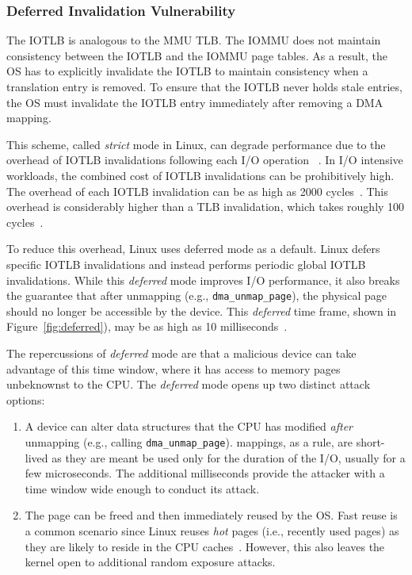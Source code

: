 \subsubsection{Deferred Invalidation Vulnerability}\label{sec:deferred}
The IOTLB is analogous to the MMU TLB. The IOMMU does not maintain consistency between the IOTLB and the IOMMU page tables. As a result, the OS has to explicitly invalidate the IOTLB to maintain consistency when a translation entry is removed. To ensure that the IOTLB never holds stale entries, the OS must invalidate the IOTLB entry immediately after removing a DMA mapping. 

This scheme, called \emph{strict} mode in Linux, can degrade performance due to the overhead of IOTLB invalidations following each I/O operation ~\cite{MMT16,MSMT18,Peleg15}. In I/O intensive workloads, the combined cost of IOTLB invalidations can be prohibitively high. The overhead of each IOTLB invalidation can be as high as 2000 cycles~\cite{ABYTS11}. This overhead is considerably higher than a TLB invalidation, which takes roughly 100 cycles~\cite{Han14}. 

To reduce this overhead, Linux uses deferred mode as a default. Linux defers specific IOTLB invalidations and instead performs periodic global IOTLB invalidations. While this \emph{deferred} mode improves I/O performance, it also breaks the guarantee that after unmapping (e.g., \texttt{dma\_unmap\_page}), the physical page should no longer be accessible by the device. This \emph{deferred} time frame, shown in Figure~\ref{fig:deferred}), may be as high as 10 milliseconds~\cite{MSMT18}.

The repercussions of \emph{deferred} mode are that a malicious device can take advantage of this time window, where it has access to memory pages unbeknownst to the CPU. The \emph{deferred} mode opens up two distinct attack options:

\begin{enumerate}[labelindent=0pt]
    \item A device can alter data structures that the CPU has modified \emph{after} unmapping (e.g., calling \texttt{dma\_unmap\_page}).
    \iova{} mappings, as a rule, are short-lived as they are meant be used only for the duration of the I/O, usually for a few microseconds. The additional milliseconds provide the attacker with a time window wide enough to conduct its attack.
    \item The page can be freed and then immediately reused by the OS. Fast reuse is a common scenario since Linux reuses \emph{hot} pages (i.e., recently used pages) as they are likely to reside in the CPU caches~\cite{hotcold}. However, this also leaves the kernel open to additional random exposure attacks.
\end{enumerate}



